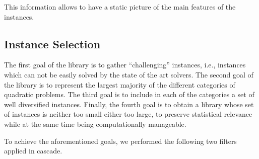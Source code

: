 This information allows to have a static picture of the main features
of the instances.


\subsection{Instance Selection}\label{subsec:selection}

The first goal of the library is to gather ``challenging'' instances,
i.e., instances which can not be easily solved by the state of the art
solvers.
The second goal of the library is to represent the largest majority of
the different categories of quadratic problems.
The third goal is to include in each of the categories a set of well
diversified instances.
Finally, the fourth goal is to obtain a library whose set of instances
is neither too small either too large, to preserve statistical
relevance while at the same time being computationally manageable.

To achieve the aforementioned goals, we performed the following two
filters applied in cascade.

